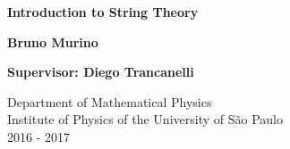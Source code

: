 \begin{titlepage}
    \begin{center}
        \vspace*{2em}
        
        \Huge
        \textbf{Introduction to String Theory}
        
        \vspace{1cm}
        \Large
        \textbf{Bruno Murino}
        
        \vspace{1cm}
        \textbf{Supervisor: Diego Trancanelli}
        
        \vfill
        
        Department of Mathematical Physics\\
        Institute of Physics of the University of São Paulo\\
        2016 - 2017
        
    \end{center}
\end{titlepage}